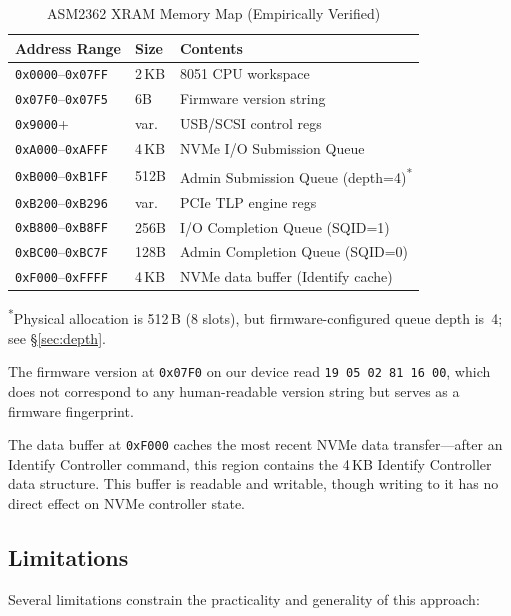 \documentclass[conference]{IEEEtran}
\begin{document}
\begin{table}[ht]
\centering
\caption{ASM2362 XRAM Memory Map (Empirically Verified)}
\label{tab:xram-map}
\begin{tabular}{@{}llp{3.2cm}@{}}
\toprule
Address Range & Size & Contents \\
\midrule
\texttt{0x0000}--\texttt{0x07FF} & 2\,KB & 8051 CPU workspace \\
\texttt{0x07F0}--\texttt{0x07F5} & 6B & Firmware version string \\
\texttt{0x9000}+ & var. & USB/SCSI control regs \\
\texttt{0xA000}--\texttt{0xAFFF} & 4\,KB & NVMe I/O Submission Queue \\
\texttt{0xB000}--\texttt{0xB1FF} & 512B & Admin Submission Queue (depth=4)\textsuperscript{*} \\
\texttt{0xB200}--\texttt{0xB296} & var. & PCIe TLP engine regs \\
\texttt{0xB800}--\texttt{0xB8FF} & 256B & I/O Completion Queue (SQID=1) \\
\texttt{0xBC00}--\texttt{0xBC7F} & 128B & Admin Completion Queue (SQID=0) \\
\texttt{0xF000}--\texttt{0xFFFF} & 4\,KB & NVMe data buffer (Identify cache) \\
\bottomrule
\end{tabular}
\smallskip
\noindent\textsuperscript{*}Physical allocation is 512\,B (8 slots), but firmware-configured queue depth is~4; see \S\ref{sec:depth}.
\end{table}

The firmware version at \texttt{0x07F0} on our device read
\texttt{19 05 02 81 16 00}, which does not correspond to any
human-readable version string but serves as a firmware fingerprint.

The data buffer at \texttt{0xF000} caches the most recent NVMe data
transfer---after an Identify Controller command, this region contains
the 4\,KB Identify Controller data structure. This buffer is readable
and writable, though writing to it has no direct effect on NVMe
controller state.


\subsection{Limitations}
\label{sec:limitations}

Several limitations constrain the practicality and generality of this
approach:
\end{document}
